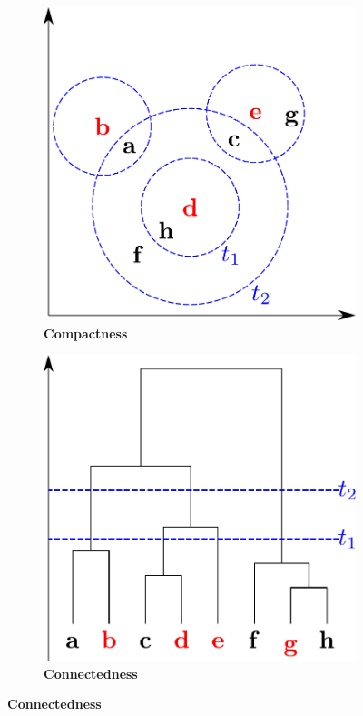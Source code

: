 \begin{figure}
    \centering
    \begin{subfigure}[b]{0.475\textwidth}
        \caption[Compactness]{\textbf{Compactness}}
        \label{subfig:Compactness}            
        \includegraphics[width=\textwidth]{Graphics/Compactness.pdf}
    \end{subfigure}
    \hfill
    \begin{subfigure}[b]{0.475\textwidth}
        \caption[Connectedness]{\textbf{Connectedness}}
        \label{subfig:Connectedness}            
        \includegraphics[width=\textwidth]{Graphics/Connectedness.pdf}

\end{subfigure}
\end{figure}
